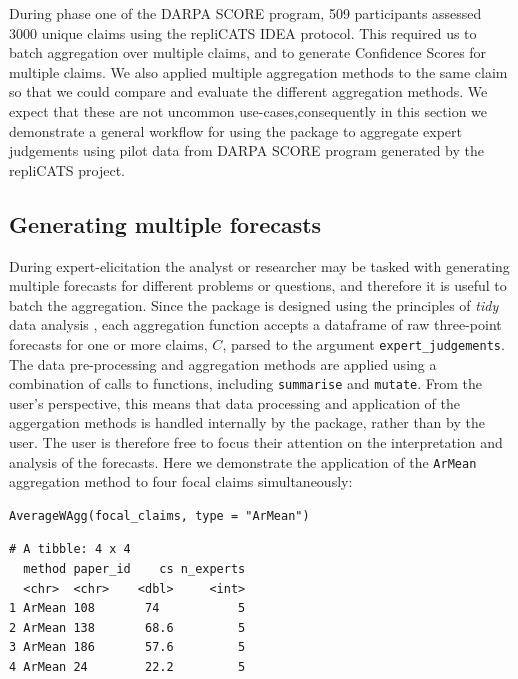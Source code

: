 \documentclass[article]{jss}
\begin{document}
During phase one of the DARPA SCORE program, 509 participants assessed
3000 unique claims using the repliCATS IDEA protocol. This required us
to batch aggregation over multiple claims, and to generate Confidence
Scores for multiple claims. We also applied multiple aggregation methods
to the same claim so that we could compare and evaluate the different
aggregation methods. We expect that these are not uncommon
use-cases,consequently in this section we demonstrate a general workflow
for using the  package to aggregate expert judgements
using pilot data from DARPA SCORE program generated by the repliCATS
project.

\hypertarget{generating-multiple-forecasts}{%
\subsection{Generating multiple
forecasts}\label{generating-multiple-forecasts}}

During expert-elicitation the analyst or researcher may be tasked with
generating multiple forecasts for different problems or questions, and
therefore it is useful to batch the aggregation. Since the
 package is designed using the principles of \emph{tidy}
data analysis \citep{tidyverse2019}, each aggregation function accepts a
dataframe of raw three-point forecasts for one or more claims, \(C\),
parsed to the argument \texttt{expert\_judgements}. The data
pre-processing and aggregation methods are applied using a combination
of calls to  functions, including \texttt{summarise} and
\texttt{mutate}. From the user's perspective, this means that data
processing and application of the aggergation methods is handled
internally by the  package, rather than by the user. The
user is therefore free to focus their attention on the interpretation
and analysis of the forecasts. Here we demonstrate the application of
the \texttt{ArMean} aggregation method to four focal claims
simultaneously:

\begin{verbatim}
AverageWAgg(focal_claims, type = "ArMean")
\end{verbatim}

\begin{verbatim}
# A tibble: 4 x 4
  method paper_id    cs n_experts
  <chr>  <chr>    <dbl>     <int>
1 ArMean 108       74           5
2 ArMean 138       68.6         5
3 ArMean 186       57.6         5
4 ArMean 24        22.2         5
\end{verbatim}
\end{document}
